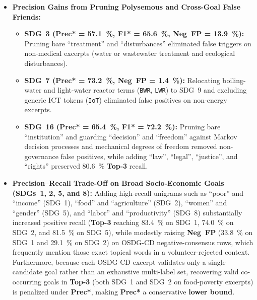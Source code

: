 \begin{itemize}
  \item \textbf{Precision Gains from Pruning Polysemous and Cross-Goal False Friends:}
  \begin{itemize}
    \item \textbf{\gls{SDG}~3 (\textbf{Prec*} = \qty{57.1}{\percent}, \textbf{F1*} = \qty{65.6}{\percent}, \textbf{Neg~FP} = \qty{13.9}{\percent}):} Pruning bare \enquote{treatment} and \enquote{disturbances} eliminated false triggers on non-medical excerpts (\eg water or wastewater treatment and ecological disturbances).


    \item \textbf{\gls{SDG}~7 (\textbf{Prec*} = \qty{73.2}{\percent}, \textbf{Neg~FP} = \qty{1.4}{\percent}):} Relocating boiling-water and light-water reactor terms (\texttt{BWR}, \texttt{LWR}) to \gls{SDG}~9 and excluding generic \gls{ICT} tokens (\eg \texttt{IoT}) eliminated false positives on non-energy excerpts.
    
    \item \textbf{\gls{SDG}~16 (\textbf{Prec*} = \qty{65.4}{\percent}, \textbf{F1*} = \qty{72.2}{\percent}):} Pruning bare \enquote{institution} and guarding \enquote{decision} and \enquote{freedom} against Markov decision processes and mechanical degrees of freedom removed non-governance false positives, while adding \enquote{law}, \enquote{legal}, \enquote{justice}, and \enquote{rights} preserved \qty{80.6}{\percent} \textbf{Top-3} recall.
  \end{itemize}

  \item \textbf{Precision--Recall Trade-Off on Broad Socio-Economic Goals (\glspl{SDG}~1, 2, 5, and 8):}
  Adding high-recall unigrams such as \enquote{poor} and \enquote{income} (\gls{SDG}~1), \enquote{food} and \enquote{agriculture} (\gls{SDG}~2), \enquote{women} and \enquote{gender} (\gls{SDG}~5), and \enquote{labor} and \enquote{productivity} (\gls{SDG}~8) substantially increased positive recall (\textbf{Top-3} reaching \qty{83.4}{\percent} on \gls{SDG}~1, \qty{74.0}{\percent} on \gls{SDG}~2, and \qty{81.5}{\percent} on \gls{SDG}~5), while modestly raising \textbf{Neg~FP} (\qty{33.8}{\percent} on \gls{SDG}~1 and \qty{29.1}{\percent} on \gls{SDG}~2) on OSDG-CD negative-consensus rows, which frequently mention those exact topical words in a volunteer-rejected context. Furthermore, because each OSDG-CD excerpt validates only a single candidate goal rather than an exhaustive multi-label set, recovering valid co-occurring goals in \textbf{Top-3} (\eg both \gls{SDG}~1 and \gls{SDG}~2 on food-poverty excerpts) is penalized under \textbf{Prec*}, making \textbf{Prec*} a conservative \textbf{lower bound}.
\end{itemize}

